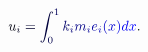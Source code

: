 \documentclass[12pt]{article}
\begin{document}
\makeatletter
\renewcommand*{\@textcolor}[3]{%
  \protect\leavevmode
  \begingroup
    \color#1{#2}#3%
  \endgroup
}
\makeatother
\begin{displaymath}
\displaystyle \mathcolor[RGB]{0,0,15}{u} _ { \mathcolor[RGB]{0,0,30}{i} } \mathcolor[RGB]{0,0,45}{=} \mathcolor[RGB]{0,0,60}{\int} _ { \mathcolor[RGB]{0,0,75}{0} } ^ { \mathcolor[RGB]{0,0,90}{1} } \mathcolor[RGB]{0,0,105}{k} _ { \mathcolor[RGB]{0,0,120}{i} } \mathcolor[RGB]{0,0,135}{m} _ { \mathcolor[RGB]{0,0,150}{i} } \mathcolor[RGB]{0,0,165}{e} _ { \mathcolor[RGB]{0,0,180}{i} } \mathcolor[RGB]{0,0,195}{(} \mathcolor[RGB]{0,0,210}{x} \mathcolor[RGB]{0,0,225}{)} \mathcolor[RGB]{0,0,240}{d} \mathcolor[RGB]{0,0,255}{x} \mathcolor[RGB]{0,15,0}{.}
\end{displaymath}
\end{document}
